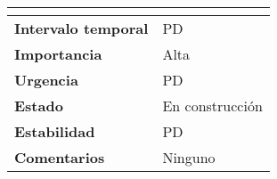 \begin{table}[H]
\begin{tabular}{|l|l|}
{\begin{itemize}
		\end{itemize} }                                                              \\ \hline
		\textbf{Intervalo temporal}   & PD                                                                  \\ \hline
		\textbf{Importancia}          & Alta                                                                  \\ \hline
		\textbf{Urgencia}             & PD                                                                  \\ \hline
		\textbf{Estado}               & En construcción                                                                  \\ \hline
		\textbf{Estabilidad}          & PD                                                                  \\ \hline
		\textbf{Comentarios}          & Ninguno                                                                  \\ \hline
	\end{tabular}
\end{table}

\vspace{5mm}

